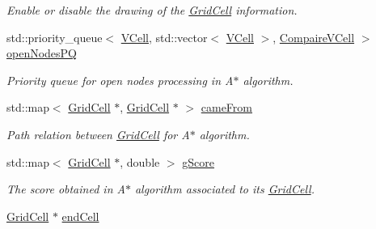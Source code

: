 \begin{DoxyCompactItemize}
\begin{DoxyCompactList}\small\item\em Enable or disable the drawing of the \hyperlink{classGridCell}{Grid\+Cell} information. \end{DoxyCompactList}\item 
std\+::priority\+\_\+queue$<$ \hyperlink{classGridMap_a3589e78d066f9c12b000f85f870afbc4}{V\+Cell}, std\+::vector$<$ \hyperlink{classGridMap_a3589e78d066f9c12b000f85f870afbc4}{V\+Cell} $>$, \hyperlink{structGridMap_1_1CompaireVCell}{Compaire\+V\+Cell} $>$ \hyperlink{classGridMap_a85c0c815d6667c3a0c0f966512df6c4d}{open\+Nodes\+PQ}\hypertarget{classGridMap_a85c0c815d6667c3a0c0f966512df6c4d}{}\label{classGridMap_a85c0c815d6667c3a0c0f966512df6c4d}

\begin{DoxyCompactList}\small\item\em Priority queue for open nodes processing in A$\ast$ algorithm. \end{DoxyCompactList}\item 
std\+::map$<$ \hyperlink{classGridCell}{Grid\+Cell} $\ast$, \hyperlink{classGridCell}{Grid\+Cell} $\ast$ $>$ \hyperlink{classGridMap_ad90ffedc0a4704793d2ad9ac05d1707a}{came\+From}\hypertarget{classGridMap_ad90ffedc0a4704793d2ad9ac05d1707a}{}\label{classGridMap_ad90ffedc0a4704793d2ad9ac05d1707a}

\begin{DoxyCompactList}\small\item\em Path relation between \hyperlink{classGridCell}{Grid\+Cell} for A$\ast$ algorithm. \end{DoxyCompactList}\item 
std\+::map$<$ \hyperlink{classGridCell}{Grid\+Cell} $\ast$, double $>$ \hyperlink{classGridMap_a5c051634746830ef50796760cdd90105}{g\+Score}\hypertarget{classGridMap_a5c051634746830ef50796760cdd90105}{}\label{classGridMap_a5c051634746830ef50796760cdd90105}

\begin{DoxyCompactList}\small\item\em The score obtained in A$\ast$ algorithm associated to its \hyperlink{classGridCell}{Grid\+Cell}. \end{DoxyCompactList}\item 
\hyperlink{classGridCell}{Grid\+Cell} $\ast$ \hyperlink{classGridMap_a0ad10e901c423350fd0e578b256bb2f8}{end\+Cell}\hypertarget{classGridMap_a0ad10e901c423350fd0e578b256bb2f8}{}\label{classGridMap_a0ad10e901c423350fd0e578b256bb2f8}


\end{DoxyCompactItemize}
